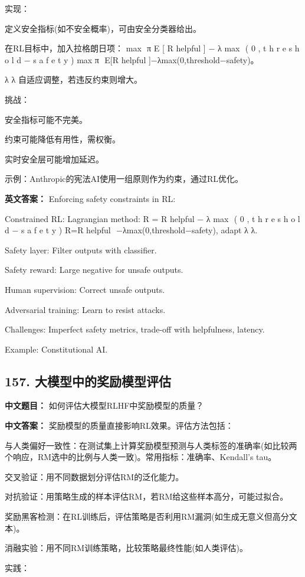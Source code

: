 \documentclass[10pt,a4paper]{ctexart}
\begin{document}
实现：

定义安全指标(如不安全概率)，可由安全分类器给出。

在RL目标中，加入拉格朗日项：
max
⁡
π
E
[
R
helpful
]
−
λ
max
⁡
(
0
,
t
h
r
e
s
h
o
l
d
−
s
a
f
e
t
y
)
max 
π
​
 E[R 
helpful
​
 ]−λmax(0,threshold−safety)。

λ
λ 自适应调整，若违反约束则增大。

挑战：

安全指标可能不完美。

约束可能降低有用性，需权衡。

实时安全层可能增加延迟。

示例：Anthropic的宪法AI使用一组原则作为约束，通过RL优化。

\textbf{英文答案：}
Enforcing safety constraints in RL:

Constrained RL: Lagrangian method: 
R
=
R
helpful
−
λ
max
⁡
(
0
,
t
h
r
e
s
h
o
l
d
−
s
a
f
e
t
y
)
R=R 
helpful
​
 −λmax(0,threshold−safety), adapt 
λ
λ.

Safety layer: Filter outputs with classifier.

Safety reward: Large negative for unsafe outputs.

Human supervision: Correct unsafe outputs.

Adversarial training: Learn to resist attacks.

Challenges: Imperfect safety metrics, trade-off with helpfulness, latency.

Example: Constitutional AI.

\subsection*{157. 大模型中的奖励模型评估}
\textbf{中文题目：} 如何评估大模型RLHF中奖励模型的质量？

\textbf{中文答案：}
奖励模型的质量直接影响RL效果。评估方法包括：

与人类偏好一致性：在测试集上计算奖励模型预测与人类标签的准确率(如比较两个响应，RM选中的比例与人类一致)。常用指标：准确率、Kendall's tau。

交叉验证：用不同数据划分评估RM的泛化能力。

对抗验证：用策略生成的样本评估RM，若RM给这些样本高分，可能过拟合。

奖励黑客检测：在RL训练后，评估策略是否利用RM漏洞(如生成无意义但高分文本)。

消融实验：用不同RM训练策略，比较策略最终性能(如人类评估)。

实践：
\end{document}
